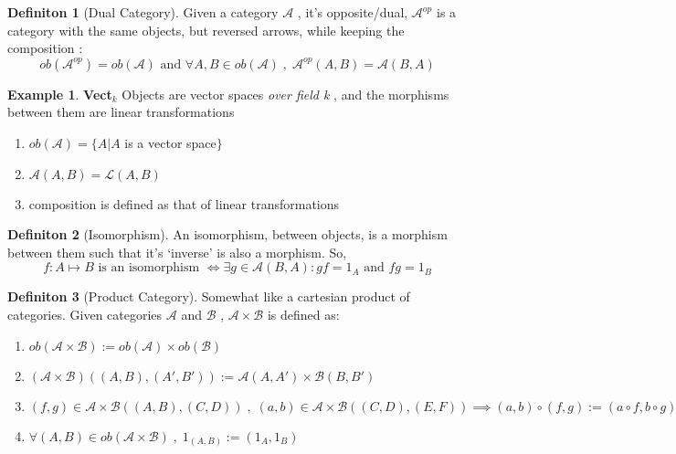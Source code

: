 \documentclass{article}
\theoremstyle{definition}
\newtheorem{example}{Example}[section]
\theoremstyle{definition}
\newtheorem{definition}{Definiton}[section]
\begin{document}
\begin{definition}[Dual Category] %
	Given a category $ \mathcal{A}  $ , it's opposite/dual, $ \mathcal{A} ^{op}  $ is a category with the same objects, but reversed arrows, while keeping the composition :
	\[ ob(\mathcal{A}^{op} ) =ob(\mathcal{A}) \text{ and } \forall A,B \in ob(\mathcal{A} )\; , \; \mathcal{A} ^{op}(A,B)=\mathcal{A} (B,A) \]
\end{definition}
\begin{example}{\textbf{Vect$ _k$ }} %
Objects are vector spaces \textit{over field k} , and the morphisms between them are linear transformations
	\begin{enumerate}[label=\roman*]
	\item $ ob(\mathcal{A} ) = \{A | A $ is  a vector space$   \}$
	\item $ \mathcal{A} (A,B) = \mathcal{L} (A,B) $
	\item  composition is defined as that of linear transformations
\end{enumerate}
\end{example}
\begin{definition}[Isomorphism] %
	An isomorphism, between objects, is a morphism between them such that it's `inverse' is also a morphism. So,
	\[ f: A \mapsto B \text{ is an isomorphism } \iff \exists g \in \mathcal{A}(B,A): gf=1_A \text{ and } fg=1_B\]
\end{definition}
\begin{definition}[Product Category] %
	Somewhat like a cartesian product of categories. Given categories $ \mathcal{A}  $ and $ \mathcal{B}  $ , $ \mathcal{A}  \times \mathcal{B}  $ is defined as:
	\begin{enumerate}[label=\roman*]
		\item $ ob( \mathcal{A}  \times \mathcal{B}) := ob(\mathcal{A} ) \times ob(\mathcal{B} )$
		\item $(\mathcal{A} \times \mathcal{B})((A,B),(A',B')):=\mathcal{A} (A,A')\times\mathcal{B} (B,B') $
		\item $ (f,g) \in \mathcal{A}\times \mathcal{B} ((A,B),(C,D)) \; , \;(a,b) \in \mathcal{A}\times \mathcal{B} ((C,D),(E,F)) \implies (a,b) \circ (f,g) := (a \circ f, b \circ g)$
		\item $ \forall (A,B) \in ob(\mathcal{A}\times \mathcal{B})\; , \; 1_{(A,B)}:=(1_A,1_B) $
	\end{enumerate}
\end{definition}
\end{document}
